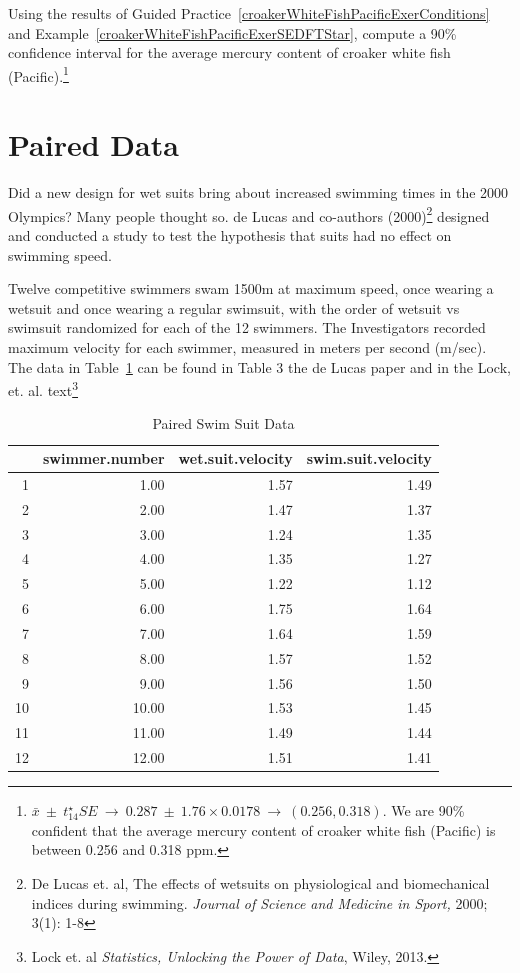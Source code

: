 \begin{exercise}
Using the results of Guided Practice~\ref{croakerWhiteFishPacificExerConditions} and Example~\ref{croakerWhiteFishPacificExerSEDFTStar}, compute a 90\% confidence interval for the average mercury content of croaker white fish (Pacific).\footnote{$\bar{x} \ \pm\ t^{\star}_{14} SE \ \to\  0.287 \ \pm\  1.76\times 0.0178\ \to\ (0.256, 0.318)$. We are 90\% confident that the average mercury content of croaker white fish (Pacific) is between 0.256 and 0.318 ppm.}


\end{exercise}

\section{Paired Data}
\label{pairedData}



Did a new design for wet suits bring about increased swimming times in the 2000 Olympics? Many people thought so.  de Lucas and co-authors (2000)\footnote{De Lucas et. al, The effects of wetsuits on physiological and biomechanical indices during swimming. \textit{Journal of Science and Medicine in Sport,} 2000; 3(1): 1-8} designed and conducted a study to test the hypothesis that suits had no effect on swimming speed. 

Twelve competitive swimmers swam 1500m at maximum speed, once wearing a wetsuit and once wearing a regular swimsuit, with the order of wetsuit vs swimsuit randomized for each of  the 12 swimmers.  The Investigators recorded maximum velocity for each swimmer, measured in meters per second (m/sec). The data in Table~\ref{swimSuitTimes} can be found in Table 3 the de Lucas paper and in the Lock, et. al. text\footnote{Lock et. al \textit{Statistics, Unlocking the Power of Data}, Wiley, 2013.}

\begin{table}[ht]
\centering
\begin{tabular}{rrrr}
  \hline
 & swimmer.number & wet.suit.velocity & swim.suit.velocity \\ 
  \hline
1 & 1.00 & 1.57 & 1.49 \\ 
  2 & 2.00 & 1.47 & 1.37 \\ 
  3 & 3.00 & 1.24 & 1.35 \\ 
  4 & 4.00 & 1.35 & 1.27 \\ 
  5 & 5.00 & 1.22 & 1.12 \\ 
  6 & 6.00 & 1.75 & 1.64 \\ 
  7 & 7.00 & 1.64 & 1.59 \\ 
  8 & 8.00 & 1.57 & 1.52 \\ 
  9 & 9.00 & 1.56 & 1.50 \\ 
  10 & 10.00 & 1.53 & 1.45 \\ 
  11 & 11.00 & 1.49 & 1.44 \\ 
  12 & 12.00 & 1.51 & 1.41 \\ 
   \hline
\end{tabular}
\caption{Paired Swim Suit Data} 
\label{swimSuitTimes}
\end{table}

